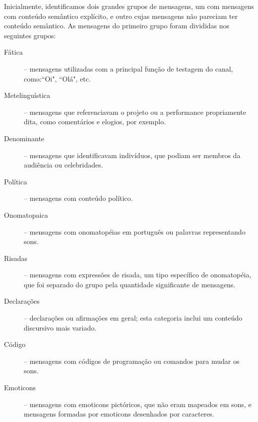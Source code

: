 

Inicialmente, identificamos dois grandes grupos de mensagens, um com mensagens com conteúdo semântico explícito, e outro cujas mensagens não pareciam ter conteúdo semântico. As mensagens do primeiro grupo foram divididas nos seguintes grupos:


\begin{description}
\item[Fática] -- mensagens utilizadas com a principal função de testagem do canal, como:``Oi", ``Olá", etc.
\item[Metelinguística] -- mensagens que referenciavam o projeto ou a performance propriamente dita, como comentários e elogios, por exemplo.
\item[Denominante] -- mensagens que identificavam indivíduos, que podiam ser membros da audiência ou celebridades.
\item[Política] -- mensagens com conteúdo político.
\item[Onomatopaica] -- mensagens com onomatopéias em português ou palavras representando sons.
\item[Risadas] -- mensagens com expressões de risada, um tipo específico de onomatopéia, que foi separado do grupo pela quantidade significante de mensagens. 
\item[Declarações] -- declarações ou afirmações em geral; esta categoria inclui um conteúdo discursivo mais variado.
\item[Código] -- mensagens com códigos de programação ou comandos para mudar os sons.
\item[Emoticons] -- mensagens com emoticons pictóricos, que não eram mapeados em sons, e mensagens formadas por emoticons desenhados por caracteres.
\end{description}

